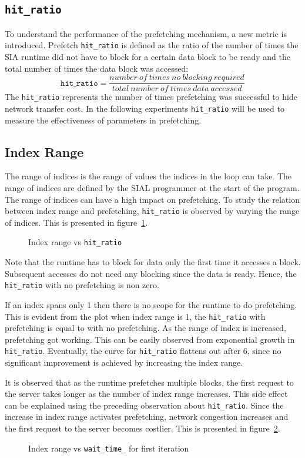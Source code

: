 \subsection{\texttt{hit\_ratio}}\label{sec:hit_ratio}
To understand the performance of the prefetching mechanism, a new metric is introduced.
Prefetch \texttt{hit\_ratio} is defined as the ratio of the number of times the
SIA runtime did not have to block for a certain data block to be ready and the total
number of times the data block was accessed:
\[
  \texttt{hit\_ratio} = \frac{number~of~times~no~blocking~required}{total~number~of~times~data~accessed}
\]
The \texttt{hit\_ratio} represents the number of times prefetching was successful
to hide network transfer cost. In the following experiments \texttt{hit\_ratio}
will be used to measure the effectiveness of parameters in prefetching.

\subsection{Index Range}
The range of indices is the range of values the indices in the loop can take.
The range of indices are defined by the SIAL programmer at the start of the program.
The range of indices can have a high impact on prefetching. To study the relation
between index range and prefetching, \texttt{hit\_ratio} is observed by varying
the range of indices. This is presented in figure~\ref{fig:hitratio}.
\begin{figure}[h]
  
  \caption{Index range vs \texttt{hit\_ratio}}
  \label{fig:hitratio}
\end{figure}

Note that the runtime has to block for data only the first time it accesses a block.
Subsequent accesses do not need any blocking since the data is ready. Hence, the
\texttt{hit\_ratio} with no prefetching is non zero.

If an index spans only 1 then there is no scope for the runtime to do prefetching.
This is evident from the plot when index range is 1, the \texttt{hit\_ratio} with
prefetching is equal to with no prefetching. As the range of index is increased,
prefetching got working. This can be easily observed from exponential growth in
\texttt{hit\_ratio}. Eventually, the curve for \texttt{hit\_ratio} flattens out
after 6, since no significant improvement is achieved by increasing the index range.

It is observed that as the runtime prefetches multiple blocks,
the first request to the server takes longer as the number of index range increases. This
side effect can be explained using the preceding observation about \texttt{hit\_ratio}.
Since the increase in index range activates prefetching, network congestion
increases and the first request
to the server becomes costlier. This is presented in figure~\ref{fig:p_first_mean}.
\begin{figure}[h]
  
  \caption{Index range vs \texttt{wait\_time\_} for first iteration}
  \label{fig:p_first_mean}
\end{figure}

